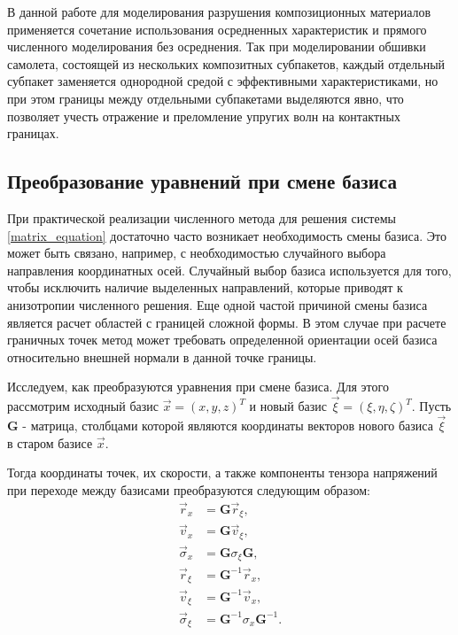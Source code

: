 В данной работе для моделирования разрушения композиционных материалов применяется сочетание использования осредненных характеристик и прямого численного моделирования без осреднения. Так при моделировании обшивки самолета, состоящей из нескольких композитных субпакетов, каждый отдельный субпакет заменяется однородной средой с эффективными характеристиками, но при этом границы между отдельными субпакетами выделяются явно, что позволяет учесть отражение и преломление упругих волн на контактных границах.


\clearpage
\newpage

\subsection{Преобразование уравнений при смене базиса}

При практической реализации численного метода для решения системы \eqref{matrix_equation} достаточно часто возникает необходимость смены базиса. Это может быть связано, например, с необходимостью случайного выбора направления координатных осей. Случайный выбор базиса используется для того, чтобы исключить наличие выделенных направлений, которые приводят к анизотропии численного решения. Еще одной частой причиной смены базиса является расчет областей с границей сложной формы. В этом случае при расчете граничных точек метод может требовать определенной ориентации осей базиса относительно внешней нормали в данной точке границы.

Исследуем, как преобразуются уравнения при смене базиса. Для этого рассмотрим исходный базис $\vec x = (x, y, z)^T$ и новый базис $\vec \xi = (\xi, \eta, \zeta)^T$. Пусть $\mathbf G$ - матрица, столбцами которой являются координаты векторов нового базиса $\vec \xi$ в старом базисе $\vec x$.

Тогда координаты точек, их скорости, а также компоненты тензора напряжений при переходе между базисами преобразуются следующим образом:
\begin{align}
\label{basis_change}
\vec r_x &= \mathbf G \vec r_{\xi},
\nonumber\\
\vec v_x &= \mathbf G \vec v_{\xi},
\nonumber\\
\vec \sigma_x &= \mathbf G \sigma_{\xi} \mathbf G,
\nonumber\\
\vec r_{\xi} &= {\mathbf G}^{-1} \vec r_x,
\nonumber\\
\vec v_{\xi} &= {\mathbf G}^{-1} \vec v_x,
\nonumber\\
\vec \sigma_{\xi} &= {\mathbf G}^{-1} \sigma_x {\mathbf G}^{-1}.
\end{align}

